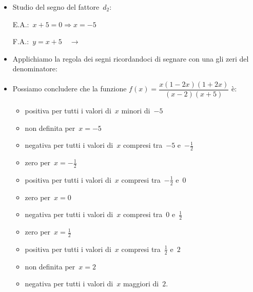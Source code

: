 \begin{esempio}{}{}
\begin{itemize} [noitemsep]
 \begin{minipage}{.45\textwidth}
  E.A.:~\(x-2=0 \Rightarrow x=2\)
 \end{minipage}
 \begin{minipage}{.25\textwidth}
  F.A.:~\(y=x-2 \quad \rightarrow\)
 \end{minipage}
 \begin{minipage}{.3\textwidth}
%   
 \end{minipage}
 \item Studio del segno del fattore~\(d_2\):\\
 \begin{minipage}{.45\textwidth}
  E.A.:~\(x+5=0 \Rightarrow x=-5\)
 \end{minipage}
 \begin{minipage}{.25\textwidth}
  F.A.:~\(y=x+5 \quad \rightarrow\)
 \end{minipage}
 \begin{minipage}{.3\textwidth}
%   
 \end{minipage}
 \item Applichiamo la regola dei segni ricordandoci di segnare con una 
  gli zeri del denominatore:

  \segnomista
 \item Possiamo concludere che la funzione
 \(f(x)=\dfrac{x(1 -2 x)(1 + 2 x)}{(x -2)(x +5)}\) è:
\begin{itemize} [noitemsep]
 \item positiva per tutti i valori di~\(x\) minori di~\(-5\)
 \item non definita per~\(x=-5\)
 \item negativa per tutti i valori di~\(x\) compresi tra~\(-5\) 
e~\(-\frac{1}{2}\)
 \item zero per~\(x=-\frac{1}{2}\)
 \item positiva per tutti i valori di~\(x\) compresi tra~\(-\frac{1}{2}\) 
e~\(0\)
 \item zero per~\(x=0\)
 \item negativa per tutti i valori di~\(x\) compresi tra~\(0\) 
e~\(\frac{1}{2}\)
 \item zero per~\(x=\frac{1}{2}\)
 \item positiva per tutti i valori di~\(x\) compresi tra~\(\frac{1}{2}\) 
e~\(2\)
 \item non definita per~\(x=2\)
 \item negativa per tutti i valori di~\(x\) maggiori di~\(2\).
\end{itemize}
\end{itemize}
 \end{esempio}


